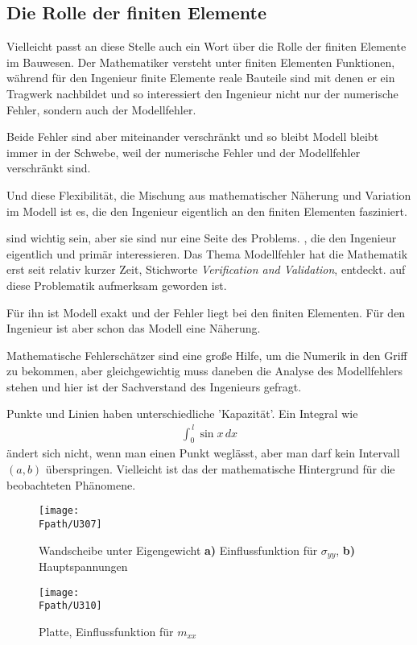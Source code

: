 {{{{{{{{{%
{\textcolor{blau2}{\section{Die Rolle der finiten Elemente}}}%
Vielleicht passt an diese Stelle auch ein Wort \"{u}ber die Rolle der finiten Elemente im Bauwesen. Der Mathematiker versteht unter finiten Elementen Funktionen, w\"{a}hrend f\"{u}r den Ingenieur finite Elemente reale Bauteile sind mit denen er ein Tragwerk nachbildet und so interessiert den Ingenieur  nicht nur der numerische Fehler, sondern auch der Modellfehler.

Beide Fehler sind aber miteinander verschr\"{a}nkt und so bleibt Modell bleibt immer in der Schwebe, weil der numerische Fehler und der Modellfehler verschr\"{a}nkt sind.

Und diese Flexibilit\"{a}t, die Mischung aus mathematischer N\"{a}herung und Variation im Modell ist es, die den Ingenieur eigentlich an den finiten Elementen fasziniert.


 sind wichtig sein, aber sie sind nur eine Seite des Problems. , die den Ingenieur eigentlich und prim\"{a}r interessieren.  Das Thema Modellfehler hat die Mathematik erst seit relativ kurzer Zeit, Stichworte {\em Verification and Validation\/}, entdeckt. auf diese Problematik aufmerksam geworden ist.

 F\"{u}r ihn ist Modell exakt und der Fehler liegt bei den finiten Elementen. F\"{u}r den Ingenieur ist aber schon das Modell eine N\"{a}herung.

Mathematische Fehlersch\"{a}tzer sind eine gro{\ss}e Hilfe, um die Numerik in den Griff zu bekommen, aber gleichgewichtig muss daneben die Analyse des Modellfehlers stehen und hier ist der Sachverstand des Ingenieurs gefragt.

Punkte und Linien haben unterschiedliche 'Kapazit\"{a}t'. Ein Integral wie
\begin{align}
\int_0^{\,l} \sin x\,dx
\end{align}
\"{a}ndert sich nicht, wenn man einen Punkt wegl\"{a}sst, aber man darf kein Intervall $(a,b)$ \"{u}berspringen. Vielleicht ist das der mathematische Hintergrund f\"{u}r die beobachteten Ph\"{a}nomene.

\begin{figure}
\centering
\texttt{[image: \\Fpath/U307]}
\caption{Wandscheibe unter Eigengewicht \textbf{ a)} Einflussfunktion f\"{u}r $\sigma_{yy}$, \textbf{ b)} Hauptspannungen }
\label{U307}%
\end{figure}%
\begin{figure}
\centering
\texttt{[image: \\Fpath/U310]}
\caption{Platte, Einflussfunktion f\"{u}r $m_{xx}$}
\label{U310}%
\end{figure}%

}}}}}}}}}
